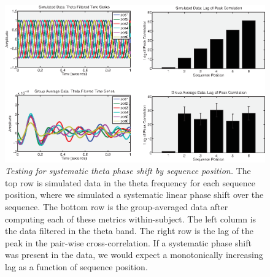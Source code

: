 \begin{figure}
  \centering
  \includegraphics[width=\textwidth]{figures/chapter3_suppfigure12.eps}
  \caption[Testing for systematic theta phase shift by sequence position.]{\textit{Testing for systematic theta phase shift by sequence position.} The top row is simulated data in the theta frequency for each sequence position, where we simulated a systematic linear phase shift over the sequence.  The bottom row is the group-averaged data after computing each of these metrics within-subject.  The left column is the data filtered in the theta band. The right row is the lag of the peak in the pair-wise cross-correlation.  If a systematic phase shift was present in the data, we would expect a monotonically increasing lag as a function of sequence position.}
  \label{chapter3_suppfigure12}
\end{figure}

